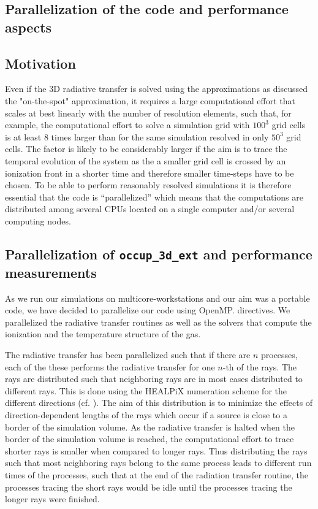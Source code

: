 \documentclass[a4paper,10pt]{article}
\begin{document}
\begin{appendix}
\section{Parallelization of the code and performance aspects}
\label{appendix:performance}
\subsection{Motivation}
Even if the 3D radiative transfer is solved using the approximations as 
discussed the "on-the-spot" approximation, it requires a large computational 
effort that scales at best linearly with the number of resolution elements, 
such that, for example, the computational effort to solve a simulation grid 
with $100^3$ grid cells is at least 8 times larger than for the same simulation 
resolved in only $50^3$ grid cells. The factor is likely to be considerably 
larger if the aim is to trace the  temporal evolution of the system as the a 
smaller grid cell is crossed by an ionization front in a shorter time and 
therefore smaller time-steps have to be chosen. To be able to perform reasonably 
resolved simulations it is therefore essential that the code is ``parallelized'' 
which means that the computations are distributed among several CPUs located on 
a single computer and/or several computing nodes.

\subsection{Parallelization of  \texttt{occup\_3d\_ext} and performance 
measurements}
As we run our simulations on multicore-workstations and our aim was a portable
code, we have decided to parallelize our code using OpenMP. directives. We 
parallelized the radiative transfer routines as well as the solvers that compute 
the ionization and the temperature structure of the gas.

The radiative transfer has been parallelized such that if there are $n$ 
processes, each of the these performs the radiative transfer for one $n$-th of 
the rays. The rays are distributed such that neighboring rays are in most cases 
distributed to different rays. This is done using the HEALPiX numeration scheme 
for the different directions (cf. \citealt{Gorski2005}). The aim of this 
distribution is to minimize the effects of direction-dependent lengths of the 
rays which occur if a source is close to a border of the simulation volume. As 
the radiative transfer is halted when the border of the simulation volume is 
reached, the computational effort to trace shorter rays is smaller when compared 
to longer rays. Thus distributing the rays such that most neighboring rays 
belong to the same process leads to different run times of the processes, such 
that at the end of the radiation transfer routine, the processes tracing the 
short rays would be idle until the processes tracing the longer rays were 
finished.   


\end{appendix}
\end{document}
